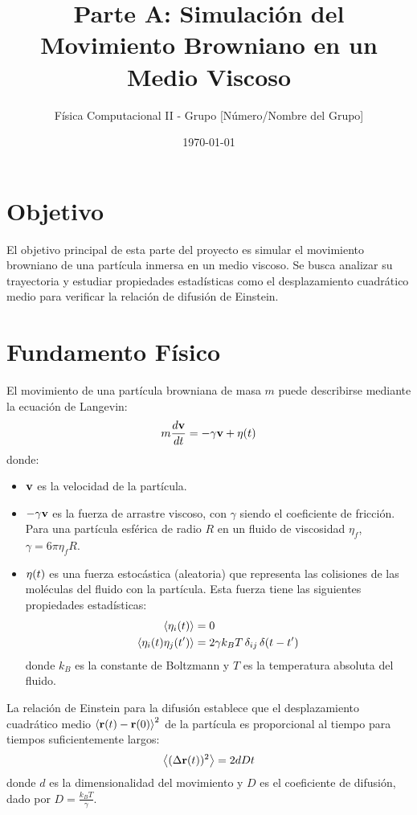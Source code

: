 \documentclass[11pt,a4paper]{article}
\title{Parte A: Simulación del Movimiento Browniano en un Medio Viscoso}
\author{Física Computacional II - Grupo [Número/Nombre del Grupo]}
\date{\today}
\begin{document}
\maketitle

\section{Objetivo}
El objetivo principal de esta parte del proyecto es simular el movimiento browniano de una partícula inmersa en un medio viscoso. Se busca analizar su trayectoria y estudiar propiedades estadísticas como el desplazamiento cuadrático medio para verificar la relación de difusión de Einstein.

\section{Fundamento Físico}
El movimiento de una partícula browniana de masa $m$ puede describirse mediante la ecuación de Langevin:
\begin{equation}
    m\frac{d\vb{v}}{dt} = -\gamma\vb{v} + \vb{\eta}(t)
    \label{eq:langevin}
\end{equation}
donde:
\begin{itemize}
    \item $\vb{v}$ es la velocidad de la partícula.
    \item $-\gamma\vb{v}$ es la fuerza de arrastre viscoso, con $\gamma$ siendo el coeficiente de fricción. Para una partícula esférica de radio $R$ en un fluido de viscosidad $\eta_f$, $\gamma = 6\pi\eta_f R$.
    \item $\vb{\eta}(t)$ es una fuerza estocástica (aleatoria) que representa las colisiones de las moléculas del fluido con la partícula. Esta fuerza tiene las siguientes propiedades estadísticas:
    \begin{align}
        \expval{\eta_i(t)} &= 0 \\
        \expval{\eta_i(t)\eta_j(t')} &= 2\gamma k_B T\,\delta_{ij}\,\delta(t-t')
        \label{eq:fuerza_estocastica}
    \end{align}
    donde $k_B$ es la constante de Boltzmann y $T$ es la temperatura absoluta del fluido.
\end{itemize}
La relación de Einstein para la difusión establece que el desplazamiento cuadrático medio $\expval{\vb{r}(t) - \vb{r}(0)}^2$ de la partícula es proporcional al tiempo para tiempos suficientemente largos:
\begin{equation}
    \expval{(\Delta\vb{r}(t))^2} = 2dDt
    \label{eq:difusion_einstein}
\end{equation}
donde $d$ es la dimensionalidad del movimiento y $D$ es el coeficiente de difusión, dado por $D = \frac{k_B T}{\gamma}$.
\end{document}
